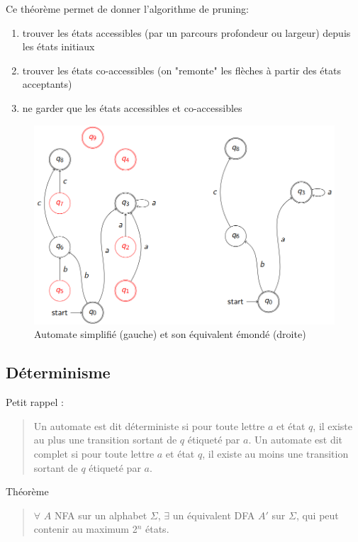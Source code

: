 \documentclass{article}
\begin{document}
Ce théorème permet de donner l'algorithme de pruning:
\begin{enumerate}
    \item trouver les états accessibles (par un parcours profondeur ou largeur) depuis les états initiaux
    \item trouver les états co-accessibles (on "remonte" les flèches à partir des états acceptants)
    \item ne garder que les états accessibles et co-accessibles
\end{enumerate}
\begin{figure}[h]
    \centering
    \includegraphics[scale=0.3]{simp_pruned_aut.png}
    \caption{Automate simplifié (gauche) et son équivalent émondé (droite)}
\end{figure}
\newpage
\subsection{Déterminisme}
Petit rappel :
\begin{quote}
    Un automate est dit déterministe si pour toute lettre $a$ et état $q$, il existe au plus une transition sortant de $q$ étiqueté par $a$.\newline
    Un automate est dit complet si pour toute lettre $a$ et état $q$, il existe au moins une transition sortant de $q$ étiqueté par $a$.\newline
\end{quote}

Théorème
\begin{quote}
    $\forall$ $A$ NFA sur un alphabet $\Sigma$, $\exists$ un équivalent DFA $A'$ sur $\Sigma$, qui peut contenir au maximum 2$^{n}$ états.
\end{quote}
\end{document}
